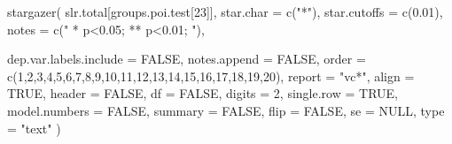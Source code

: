 \documentclass[
]{article}
\newenvironment{Shaded}{\begin{snugshade}}{\end{snugshade}}
\newcommand{\AttributeTok}[1]{\textcolor[rgb]{0.77,0.63,0.00}{#1}}
\newcommand{\ConstantTok}[1]{\textcolor[rgb]{0.00,0.00,0.00}{#1}}
\newcommand{\DecValTok}[1]{\textcolor[rgb]{0.00,0.00,0.81}{#1}}
\newcommand{\FloatTok}[1]{\textcolor[rgb]{0.00,0.00,0.81}{#1}}
\newcommand{\FunctionTok}[1]{\textcolor[rgb]{0.00,0.00,0.00}{#1}}
\newcommand{\NormalTok}[1]{#1}
\newcommand{\StringTok}[1]{\textcolor[rgb]{0.31,0.60,0.02}{#1}}
\begin{document}
\begin{Shaded}
\begin{Highlighting}[]
\FunctionTok{stargazer}\NormalTok{( slr.total[groups.poi.test[}\DecValTok{23}\NormalTok{]],}
          \AttributeTok{star.char =} \FunctionTok{c}\NormalTok{(}\StringTok{"*"}\NormalTok{), }
          \AttributeTok{star.cutoffs =} \FunctionTok{c}\NormalTok{(}\FloatTok{0.01}\NormalTok{),}
          \AttributeTok{notes =} \FunctionTok{c}\NormalTok{(}\StringTok{" * p\textless{}0.05; ** p\textless{}0.01; "}\NormalTok{),}

          \AttributeTok{dep.var.labels.include =} \ConstantTok{FALSE}\NormalTok{, }
          \AttributeTok{notes.append =} \ConstantTok{FALSE}\NormalTok{,  }\AttributeTok{order =} \FunctionTok{c}\NormalTok{(}\DecValTok{1}\NormalTok{,}\DecValTok{2}\NormalTok{,}\DecValTok{3}\NormalTok{,}\DecValTok{4}\NormalTok{,}\DecValTok{5}\NormalTok{,}\DecValTok{6}\NormalTok{,}\DecValTok{7}\NormalTok{,}\DecValTok{8}\NormalTok{,}\DecValTok{9}\NormalTok{,}\DecValTok{10}\NormalTok{,}\DecValTok{11}\NormalTok{,}\DecValTok{12}\NormalTok{,}\DecValTok{13}\NormalTok{,}\DecValTok{14}\NormalTok{,}\DecValTok{15}\NormalTok{,}\DecValTok{16}\NormalTok{,}\DecValTok{17}\NormalTok{,}\DecValTok{18}\NormalTok{,}\DecValTok{19}\NormalTok{,}\DecValTok{20}\NormalTok{), }
          \AttributeTok{report =} \StringTok{"vc*"}\NormalTok{, }\AttributeTok{align =} \ConstantTok{TRUE}\NormalTok{, }\AttributeTok{header =} \ConstantTok{FALSE}\NormalTok{, }\AttributeTok{df =} \ConstantTok{FALSE}\NormalTok{, }\AttributeTok{digits =} \DecValTok{2}\NormalTok{, }\AttributeTok{single.row =} \ConstantTok{TRUE}\NormalTok{,}
          \AttributeTok{model.numbers =} \ConstantTok{FALSE}\NormalTok{,  }
          \AttributeTok{summary =} \ConstantTok{FALSE}\NormalTok{, }
          \AttributeTok{flip =} \ConstantTok{FALSE}\NormalTok{, }\AttributeTok{se =} \ConstantTok{NULL}\NormalTok{, }\AttributeTok{type =} \StringTok{"text"}\NormalTok{ )}
\end{Highlighting}
\end{Shaded}
\end{document}
